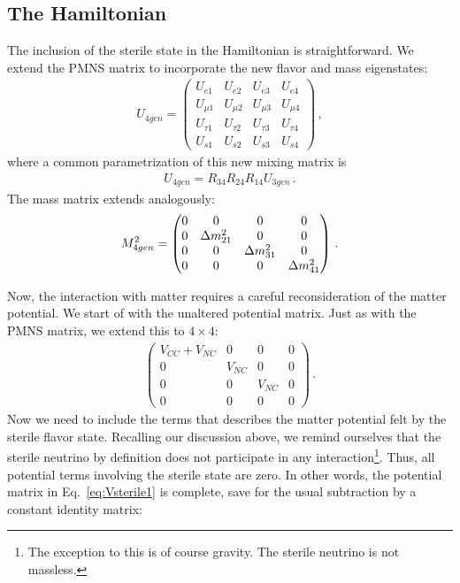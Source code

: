 \subsection{The Hamiltonian}
The inclusion of the sterile state in the Hamiltonian is straightforward. We extend the PMNS matrix to incorporate the new flavor and mass eigenstates: 
\begin{align}
    U_{4gen} =
    \begin{pmatrix}
    U_{e1} & U_{e2} & U_{e3} & U_{e4} \\
    U_{\mu1} & U_{\mu2} & U_{\mu3} & U_{\mu4} \\
    U_{\tau1} & U_{\tau2} & U_{\tau3} & U_{\tau4} \\
    U_{s1} & U_{s2} & U_{s3} & U_{s4}
    \end{pmatrix}\,,
\end{align}
where a common parametrization of this new mixing matrix is 
\begin{align}\label{eq:U4gen_param}
    U_{4gen} = R_{34}R_{24}R_{14}U_{3gen}\,.
\end{align}
The mass matrix extends analogously:
\begin{align}\label{eq:dm4gen}
    M^2_{4gen} =
    \begin{pmatrix}
        0 & 0 & 0 & 0\\
        0 & \dm_{21} & 0  & 0 \\
        0 & 0 & \dm_{31} & 0 \\
        0 & 0 & 0 & \dm_{41} \\
    \end{pmatrix}\,.
\end{align}

Now, the interaction with matter requires a careful reconsideration of the matter potential. We start of with the unaltered potential matrix. 
Just as with the PMNS matrix, we extend this to $4\times4$:
\begin{align}\label{eq:Vsterile1}
    \begin{pmatrix}
        V_{CC} + V_{NC} & 0 & 0 & 0 \\
        0 &V_{NC} & 0 & 0 \\
        0 & 0 & V_{NC} & 0 \\
        0 & 0 & 0 & 0 
    \end{pmatrix}\,.
\end{align}
Now we need to include the terms that describes the matter potential felt by the sterile flavor state. Recalling our discussion above, we remind ourselves that the sterile neutrino by definition
does not participate in any interaction\footnote{The exception to this is of course gravity. The sterile neutrino is not massless.}. Thus, all potential terms involving the sterile state are zero. 
In other words, the potential matrix in Eq.~\ref{eq:Vsterile1} is complete, save for the usual subtraction by a constant identity matrix:

